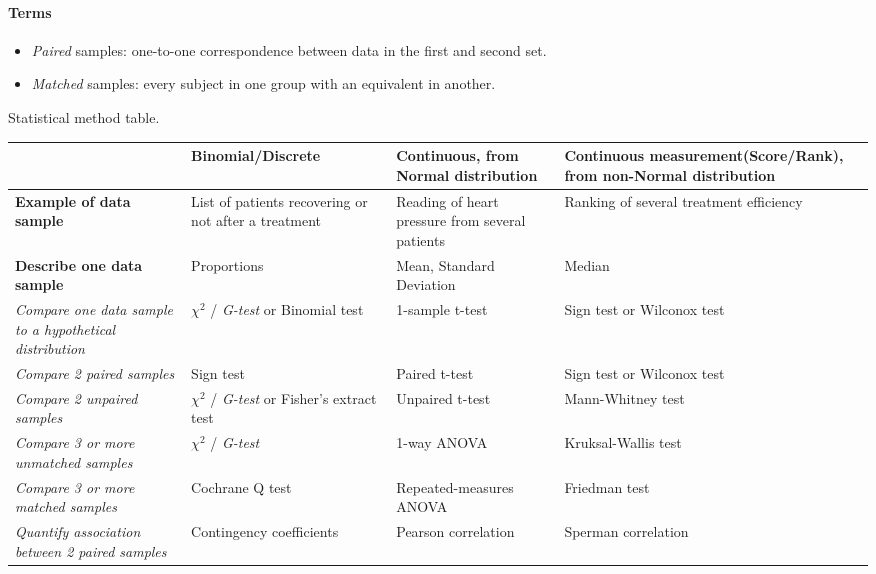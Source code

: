 \paragraph{Terms}
\begin{itemize}
    \item \emph{Paired} samples: one-to-one correspondence between data in the first and
        second set.
    \item \emph{Matched} samples: every subject in one group with an equivalent in 
        another.
\end{itemize}


\label{statistical_method_table}{Statistical method table.}\\ 
\begin{tabular}{|*{4}{b{4cm}|}}
\hline
& \textbf{Binomial/Discrete} & \textbf{Continuous, from Normal distribution} & 
\textbf{Continuous measurement\newline (Score/Rank), from non-Normal distribution} \\
\hline
    \textbf{Example of data sample} & List of patients recovering or not after a 
    treatment & Reading of heart pressure from several patients & Ranking of several
    treatment efficiency\\
\hline
    \textbf{Describe one data sample} & Proportions & Mean, Standard Deviation & Median \\
    \hline
    \emph{Compare one data sample to a hypothetical distribution} & $\chi^{2}$ / \emph{G-test} or \label{binomial_test}{Binomial test} & 1-sample t-test & Sign test or Wilconox test \\
    \hline
    \emph{Compare 2 paired samples} & Sign test & Paired t-test & Sign test or Wilconox test \\
    \hline
    \emph{Compare 2 unpaired samples} & $\chi^{2}$ / \emph{G-test} or Fisher's extract test & Unpaired t-test & Mann-Whitney test \\
    \hline
    \emph{Compare 3 or more unmatched samples} & $\chi^{2}$ / \emph{G-test} & 1-way ANOVA & Kruksal-Wallis test \\
    \hline
    \emph{Compare 3 or more matched samples} & Cochrane Q test & Repeated-measures ANOVA & Friedman test\\
    \hline
    \emph{Quantify association between 2 paired samples} & Contingency coefficients & Pearson correlation & Sperman correlation \\
    \hline
\end{tabular}
